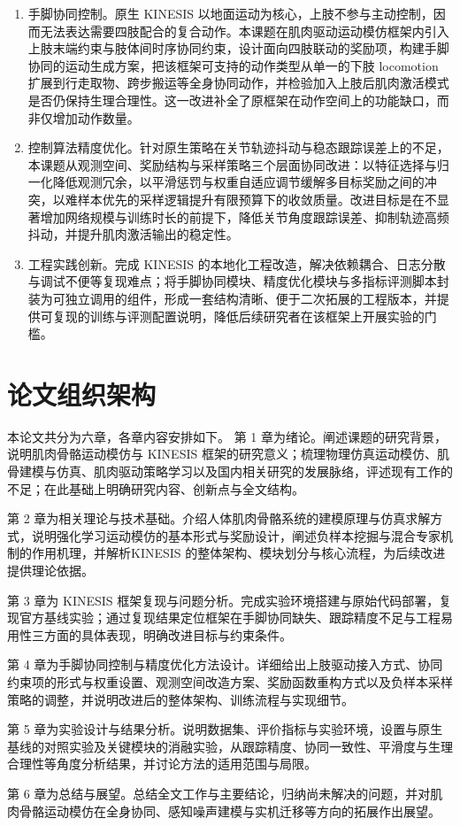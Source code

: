 \begin{enumerate}
	\item 手脚协同控制。原生 KINESIS 以地面运动为核心，上肢不参与主动控制，因而无法表达需要四肢配合的复合动作。本课题在肌肉驱动运动模仿框架内引入上肢末端约束与肢体间时序协同约束，设计面向四肢联动的奖励项，构建手脚协同的运动生成方案，把该框架可支持的动作类型从单一的下肢 locomotion 扩展到行走取物、跨步搬运等全身协同动作，并检验加入上肢后肌肉激活模式是否仍保持生理合理性。这一改进补全了原框架在动作空间上的功能缺口，而非仅增加动作数量。
	\item 控制算法精度优化。针对原生策略在关节轨迹抖动与稳态跟踪误差上的不足，本课题从观测空间、奖励结构与采样策略三个层面协同改进：以特征选择与归一化降低观测冗余，以平滑惩罚与权重自适应调节缓解多目标奖励之间的冲突，以难样本优先的采样逻辑提升有限预算下的收敛质量。改进目标是在不显著增加网络规模与训练时长的前提下，降低关节角度跟踪误差、抑制轨迹高频抖动，并提升肌肉激活输出的稳定性。
	\item 工程实践创新。完成 KINESIS 的本地化工程改造，解决依赖耦合、日志分散与调试不便等复现难点；将手脚协同模块、精度优化模块与多指标评测脚本封装为可独立调用的组件，形成一套结构清晰、便于二次拓展的工程版本，并提供可复现的训练与评测配置说明，降低后续研究者在该框架上开展实验的门槛。
\end{enumerate}

\section{论文组织架构}
本论文共分为六章，各章内容安排如下。
第 1 章为绪论。阐述课题的研究背景，说明肌肉骨骼运动模仿与 KINESIS 框架的研究意义；梳理物理仿真运动模仿、肌骨建模与仿真、肌肉驱动策略学习以及国内相关研究的发展脉络，评述现有工作的不足；在此基础上明确研究内容、创新点与全文结构。

第 2 章为相关理论与技术基础。介绍人体肌肉骨骼系统的建模原理与仿真求解方式，说明强化学习运动模仿的基本形式与奖励设计，阐述负样本挖掘与混合专家机制的作用机理，并解析KINESIS 的整体架构、模块划分与核心流程，为后续改进提供理论依据。

第 3 章为 KINESIS 框架复现与问题分析。完成实验环境搭建与原始代码部署，复现官方基线实验；通过复现结果定位框架在手脚协同缺失、跟踪精度不足与工程易用性三方面的具体表现，明确改进目标与约束条件。

第 4 章为手脚协同控制与精度优化方法设计。详细给出上肢驱动接入方式、协同约束项的形式与权重设置、观测空间改造方案、奖励函数重构方式以及负样本采样策略的调整，并说明改进后的整体架构、训练流程与实现细节。

第 5 章为实验设计与结果分析。说明数据集、评价指标与实验环境，设置与原生基线的对照实验及关键模块的消融实验，从跟踪精度、协同一致性、平滑度与生理合理性等角度分析结果，并讨论方法的适用范围与局限。

第 6 章为总结与展望。总结全文工作与主要结论，归纳尚未解决的问题，并对肌肉骨骼运动模仿在全身协同、感知噪声建模与实机迁移等方向的拓展作出展望。
